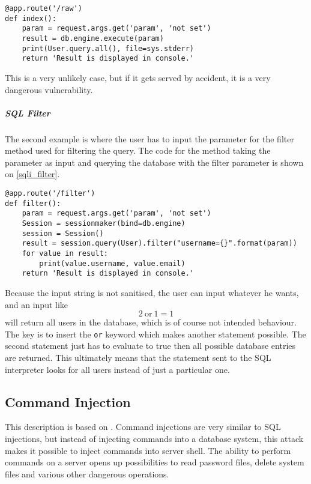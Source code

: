 \begin{lstlisting}[style={python}, deletekeywords={file, FILE}, caption={An SQL statement is taken as input and executed directly on the database}, label={sqli_naive}, firstnumber=24]
@app.route('/raw')
def index():
    param = request.args.get('param', 'not set')
    result = db.engine.execute(param)
    print(User.query.all(), file=sys.stderr)
    return 'Result is displayed in console.'
\end{lstlisting}
This is a very unlikely case, but if it gets served by accident, it is a very dangerous vulnerability.

\subparagraph{SQL Filter}
The second example is where the user has to input the parameter for the filter method used for filtering the query.
The code for the method taking the parameter as input and querying the database with the filter parameter is shown on \cref{sqli_filter}.

\begin{lstlisting}[style={python}, caption={A filter string is taken as input and used as a parameter in the filter function.}, label={sqli_filter}, firstnumber=31]
@app.route('/filter')
def filter():
    param = request.args.get('param', 'not set')
    Session = sessionmaker(bind=db.engine)
    session = Session()
    result = session.query(User).filter("username={}".format(param))
    for value in result:
        print(value.username, value.email)
    return 'Result is displayed in console.'
\end{lstlisting}

Because the input string is not sanitised, the user can input whatever he wants, and an input like
\[2 ~ \text{or} ~ 1 = 1\]
will return all users in the database, which is of course not intended behaviour.
The key is to insert the \texttt{or} keyword which makes another statement possible.
The second statement just has to evaluate to true then all possible database entries are returned.
This ultimately means that the statement sent to the SQL interpreter looks for all users instead of just a particular one.

\subsection{Command Injection}
This description is based on \citet{commandinjection}.
Command injections are very similar to SQL injections, but instead of injecting commands into a database system, this attack makes it possible to inject commands into server shell.
The ability to perform commands on a server opens up possibilities to read password files, delete system files and various other dangerous operations.

